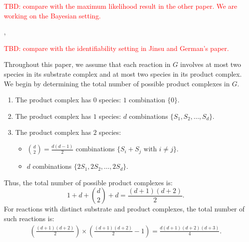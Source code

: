 \documentclass[pdflatex,sn-mathphys-num]{sn-jnl}%
\theoremstyle{thmstyleone}%
\theoremstyle{thmstyletwo}%
\theoremstyle{thmstylethree}%
\begin{document}
\textcolor{red}{TBD: compare with the maximum likelihood result in the other paper. We are working on the Bayesian setting. }

\cite{siam_Zhang2019}, \cite{grzeg_logistic}

\textcolor{red}{TBD: compare with the identifiability setting in Jinsu and German's paper. }



Throughout this paper, we assume that each reaction in $G$ involves at most two species in its substrate complex and at most two species in its product complex.
We begin by determining the total number of possible product complexes in $G$.

\begin{enumerate}
\item[(1)] The product complex has $0$ species: $1$ combination $\{ 0 \}$.

\item[(2)] The product complex has $1$ species: $d$ combinations  $\{ S_1, S_2, \ldots, S_d \}$.

\item[(3)] The product complex has $2$ species:
\begin{itemize}
\item $\binom{d}{2} = \frac{d(d-1)}{2}$ combinations  $\{ S_i + S_j \text{ with } i \neq j \}$. \\[-1pt]

\item $d$ combinations  $\{ 2 S_1, 2 S_2, \ldots, 2 S_d \}$.
\end{itemize}
\end{enumerate}
Thus, the total number of possible product complexes is:
\[
1 + d + \binom{d}{2} + d = \frac{(d+1)(d+2)}{2}.
\]
For reactions with distinct substrate and product complexes, the total number of such reactions is:
\begin{equation}
    \begin{aligned}
    \left( \frac{(d+1)(d+2)}{2} \right) \times \left( \frac{(d+1)(d+2)}{2} - 1 \right) = \frac{d(d+1)(d+2)(d+3)}{4}.
        \label{eq:total_reaction_numbers}
    \end{aligned}
\end{equation}
\end{document}
